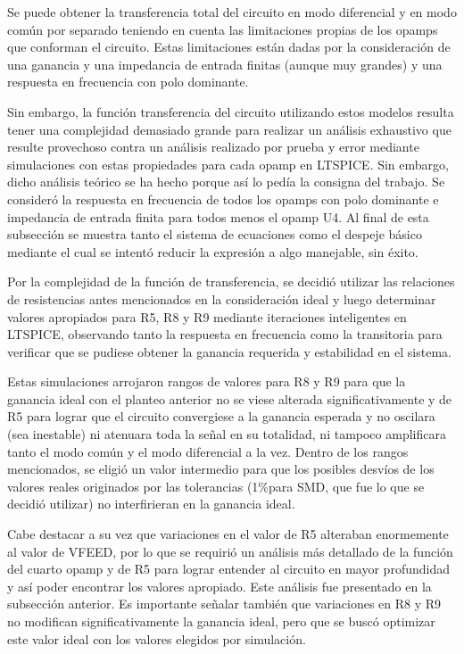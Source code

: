 \documentclass[../../tc_tp3_main.tex]{subfiles}
\begin{document}
Se puede obtener la transferencia total del circuito en modo diferencial y en modo común por separado teniendo en cuenta las limitaciones propias de los opamps que conforman el circuito. Estas limitaciones están dadas por la consideración de una ganancia y una impedancia de entrada finitas (aunque muy grandes) y una respuesta en frecuencia con polo dominante.\par
Sin embargo, la función transferencia del circuito utilizando estos modelos resulta tener una complejidad demasiado grande para realizar un análisis exhaustivo que resulte provechoso contra un análisis realizado por prueba y error mediante simulaciones con estas propiedades para cada opamp en LTSPICE. Sin embargo, dicho análisis teórico se ha hecho porque así lo pedía la consigna del trabajo. Se consideró la respuesta en frecuencia de todos los opamps con polo dominante e impedancia de entrada finita para todos menos el opamp U4. Al final de esta subsección se muestra tanto el sistema de ecuaciones como el despeje básico mediante el cual se intentó reducir la expresión a algo manejable, sin éxito.\par
Por la complejidad de la función de transferencia, se decidió utilizar las relaciones de resistencias antes mencionados en la consideración ideal y luego determinar valores apropiados para R5, R8 y R9 mediante iteraciones inteligentes en LTSPICE, observando tanto la respuesta en frecuencia como la transitoria para verificar que se pudiese obtener la ganancia requerida y estabilidad en el sistema.\par
Estas simulaciones arrojaron rangos de valores para R8 y R9 para que la ganancia ideal con el planteo anterior no se viese alterada significativamente y de R5 para lograr que el circuito convergiese a la ganancia esperada y no oscilara (sea inestable) ni atenuara toda la señal en su totalidad, ni tampoco amplificara tanto el modo común y el modo diferencial a la vez.  Dentro de los rangos mencionados, se eligió un valor intermedio para que los posibles desvíos de los valores reales originados por las tolerancias (1\%para SMD, que fue lo que se decidió utilizar) no interfirieran en la ganancia ideal.\par
Cabe destacar a su vez que variaciones en el valor de R5 alteraban enormemente al valor de VFEED, por lo que se requirió un análisis más detallado de la función del cuarto opamp y de R5 para lograr entender al circuito en mayor profundidad y así poder encontrar los valores apropiado. Este análisis fue presentado en la subsección anterior. Es importante señalar también que variaciones en R8 y R9 no modifican significativamente la ganancia ideal, pero que se buscó optimizar este valor ideal con los valores elegidos por simulación.\par
 
\end{document}
